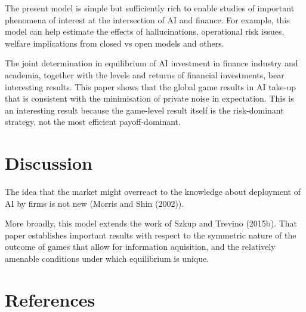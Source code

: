 \documentclass[
]{article}
\theoremstyle{definition}
\theoremstyle{plain}
\theoremstyle{remark}
\begin{document}
The present model is simple but sufficiently rich to enable studies of
important phenomena of interest at the intersection of AI and finance.
For example, this model can help estimate the effects of hallucinations,
operational risk issues, welfare implications from closed vs open models
and others.

The joint determination in equilibrium of AI investment in finance
industry and academia, together with the levels and returns of financial
investments, bear interesting results. This paper shows that the global
game results in AI take-up that is consistent with the minimisation of
private noise in expectation. This is an interesting result because the
game-level result itself is the risk-dominant strategy, not the most
efficient payoff-dominant.

\section{Discussion}\label{discussion}

The idea that the market might overreact to the knowledge about
deployment of AI by firms is not new (Morris and Shin (2002)).

More broadly, this model extends the work of Szkup and Trevino (2015b).
That paper establishes important results with respect to the symmetric
nature of the outcome of games that allow for information aquisition,
and the relatively amenable conditions under which equilibrium is
unique.

\section*{References}\label{references}
\end{document}
